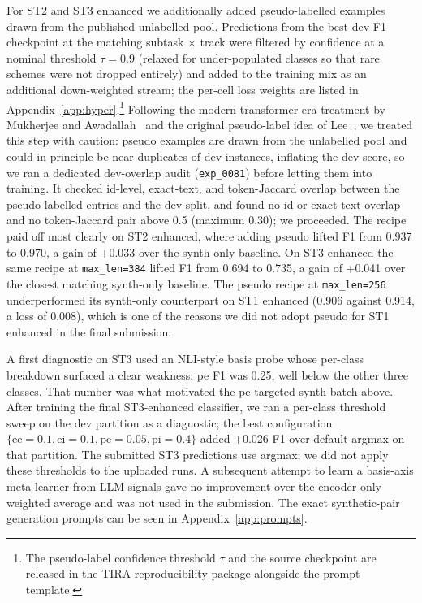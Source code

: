 For ST2 and ST3 enhanced we additionally added pseudo-labelled examples drawn from the published unlabelled pool. Predictions from the best dev-F1 checkpoint at the matching subtask $\times$ track were filtered by confidence at a nominal threshold $\tau=0.9$ (relaxed for under-populated classes so that rare schemes were not dropped entirely) and added to the training mix as an additional down-weighted stream; the per-cell loss weights are listed in Appendix~\ref{app:hyper}.\footnote{The pseudo-label confidence threshold $\tau$ and the source checkpoint are released in the TIRA reproducibility package alongside the prompt template.} Following the modern transformer-era treatment by Mukherjee and Awadallah~\cite{mukherjee2020ust} and the original pseudo-label idea of Lee~\cite{lee2013pseudolabel}, we treated this step with caution: pseudo examples are drawn from the unlabelled pool and could in principle be near-duplicates of dev instances, inflating the dev score, so we ran a dedicated dev-overlap audit (\texttt{exp\_0081}) before letting them into training. It checked id-level, exact-text, and token-Jaccard overlap between the pseudo-labelled entries and the dev split, and found no id or exact-text overlap and no token-Jaccard pair above 0.5 (maximum 0.30); we proceeded. %
The recipe paid off most clearly on ST2 enhanced, where adding pseudo lifted F1 from 0.937 to 0.970, a gain of +0.033 over the synth-only baseline. %
On ST3 enhanced the same recipe at \texttt{max\_len=384} lifted F1 from 0.694 to 0.735, a gain of +0.041 over the closest matching synth-only baseline. %
The pseudo recipe at \texttt{max\_len=256} underperformed its synth-only counterpart on ST1 enhanced (0.906 against 0.914, a loss of 0.008), %
which is one of the reasons we did not adopt pseudo for ST1 enhanced in the final submission.

A first diagnostic on ST3 used an NLI-style basis probe whose per-class breakdown surfaced a clear weakness: \textsf{pe} F1 was 0.25, well below the other three classes. %
That number was what motivated the \textsf{pe}-targeted synth batch above. After training the final ST3-enhanced classifier, we ran a per-class threshold sweep on the dev partition as a diagnostic; the best configuration $\{\text{ee}=0.1, \text{ei}=0.1, \text{pe}=0.05, \text{pi}=0.4\}$ added +0.026 F1 over default argmax on that partition. The submitted ST3 predictions use argmax; we did not apply these thresholds to the uploaded runs. %
A subsequent attempt to learn a basis-axis meta-learner from LLM signals gave no improvement over the encoder-only weighted average and was not used in the submission. %
\label{sec:thresholds}
The exact synthetic-pair generation prompts can be seen in Appendix~\ref{app:prompts}.


